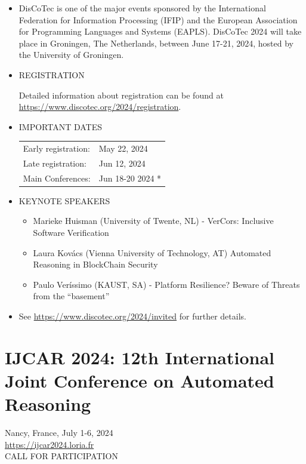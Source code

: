 \documentclass[prodmode,acmtecs]{acmsmall} %
\begin{document}
\begin{itemize}\item   DisCoTec is one of the major events sponsored by the International Federation for Information Processing (IFIP) and the European Association for Programming Languages and Systems (EAPLS). DisCoTec 2024 will take place in Groningen, The Netherlands, between June 17-21, 2024, hosted by the University of Groningen.  
 
\item  REGISTRATION   
 
  Detailed information about registration can be found at \href{https://www.discotec.org/2024/registration}{https://www.discotec.org/2024/registration}. 
 
\item  IMPORTANT DATES  
 
\begin{tabulary}{\linewidth}{LL}Early registration:  & May 22, 2024 \\
Late registration:  & Jun 12, 2024 \\
Main Conferences:  & Jun 18-20 2024 * \\
\end{tabulary}
 
\item  KEYNOTE SPEAKERS 
 
\begin{itemize}\item  Marieke Huisman (University of Twente, NL) - VerCors: Inclusive Software Verification
\item  Laura Kovács (Vienna University of Technology, AT) Automated Reasoning in BlockChain Security
\item  Paulo Veríssimo (KAUST, SA) - Platform Resilience? Beware of Threats from the “basement”
\end{itemize} 
\item  See \href{https://www.discotec.org/2024/invited}{https://www.discotec.org/2024/invited} for further details. 
 
\end{itemize}\section{IJCAR 2024: 12th International Joint Conference on Automated Reasoning}\label{IJCAR2024}  Nancy, France, July 1-6, 2024\\ 
  \href{https://ijcar2024.loria.fr}{https://ijcar2024.loria.fr}\\ 
CALL FOR PARTICIPATION 
\end{document}

